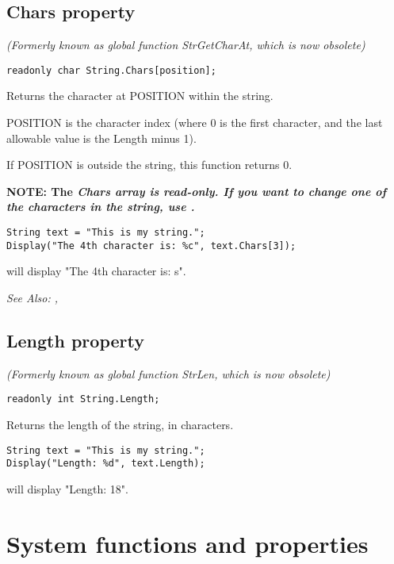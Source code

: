 \subsection{Chars property}\label{String.Chars}%

\it{(Formerly known as global function StrGetCharAt, which is now obsolete)}

\begin{verbatim}
readonly char String.Chars[position];
\end{verbatim}
Returns the character at POSITION within the string.

POSITION is the character index (where 0 is the first character, and the last
allowable value is the Length minus 1).

If POSITION is outside the string, this function returns 0.

\bf{NOTE:} The \it{Chars} array is read-only. If you want to change one of the characters
in the string, use .

\begin{verbatim}
String text = "This is my string.";
Display("The 4th character is: %c", text.Chars[3]);
\end{verbatim}
will display "The 4th character is: s".

\it{See Also:} ,


\subsection{Length property}\label{String.Length}%

\it{(Formerly known as global function StrLen, which is now obsolete)}

\begin{verbatim}
readonly int String.Length;
\end{verbatim}
Returns the length of the string, in characters.

\begin{verbatim}
String text = "This is my string.";
Display("Length: %d", text.Length);
\end{verbatim}
will display "Length: 18".



\section{System functions and properties}%


